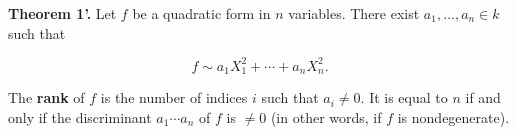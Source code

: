 \textbf{Theorem 1'.} Let $f$ be a quadratic form in $n$ variables. There exist $a_1, \ldots, a_n \in k$ such that

$$f \sim a_1 X_1^2 + \cdots + a_n X_n^2.$$

The \textbf{rank} of $f$ is the number of indices $i$ such that $a_i \neq 0$. It is equal to $n$ if and only if the discriminant $a_1 \cdots a_n$ of $f$ is $\neq 0$ (in other words, if $f$ is nondegenerate).
